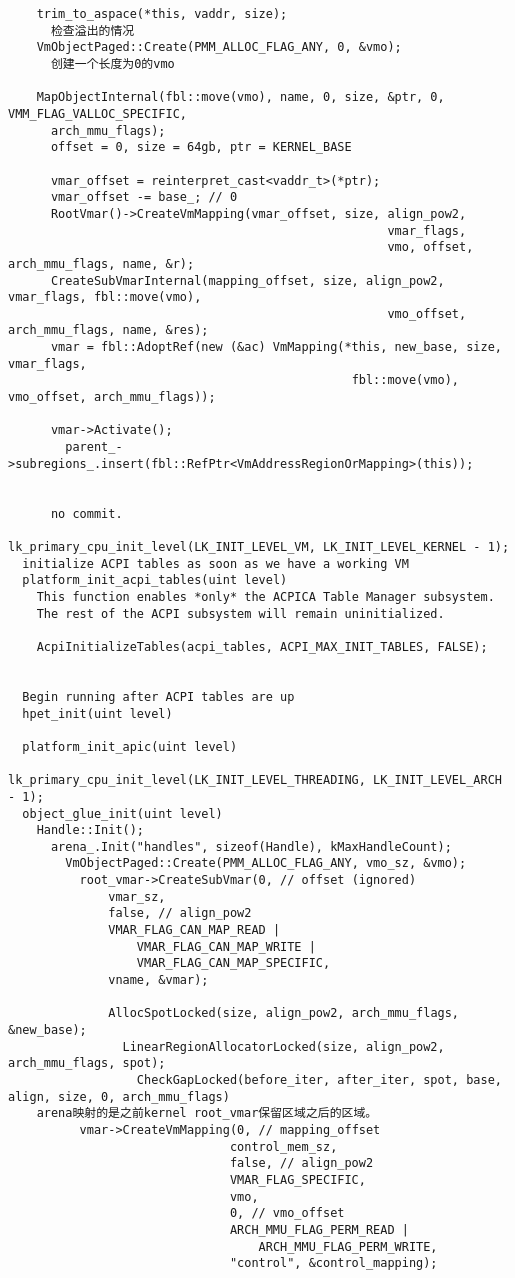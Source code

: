 \begin{verbatim}
    trim_to_aspace(*this, vaddr, size);
      检查溢出的情况
    VmObjectPaged::Create(PMM_ALLOC_FLAG_ANY, 0, &vmo);  
      创建一个长度为0的vmo

    MapObjectInternal(fbl::move(vmo), name, 0, size, &ptr, 0, VMM_FLAG_VALLOC_SPECIFIC,
      arch_mmu_flags);
      offset = 0, size = 64gb, ptr = KERNEL_BASE

      vmar_offset = reinterpret_cast<vaddr_t>(*ptr);
      vmar_offset -= base_; // 0
      RootVmar()->CreateVmMapping(vmar_offset, size, align_pow2,
                                                     vmar_flags,
                                                     vmo, offset, arch_mmu_flags, name, &r);
      CreateSubVmarInternal(mapping_offset, size, align_pow2, vmar_flags, fbl::move(vmo),
                                                     vmo_offset, arch_mmu_flags, name, &res);
      vmar = fbl::AdoptRef(new (&ac) VmMapping(*this, new_base, size, vmar_flags,
                                                fbl::move(vmo), vmo_offset, arch_mmu_flags));
      
      vmar->Activate();
        parent_->subregions_.insert(fbl::RefPtr<VmAddressRegionOrMapping>(this));
      
      
      no commit.

lk_primary_cpu_init_level(LK_INIT_LEVEL_VM, LK_INIT_LEVEL_KERNEL - 1);
  initialize ACPI tables as soon as we have a working VM
  platform_init_acpi_tables(uint level)
    This function enables *only* the ACPICA Table Manager subsystem.
    The rest of the ACPI subsystem will remain uninitialized.

    AcpiInitializeTables(acpi_tables, ACPI_MAX_INIT_TABLES, FALSE);

  
  Begin running after ACPI tables are up
  hpet_init(uint level)

  platform_init_apic(uint level)

lk_primary_cpu_init_level(LK_INIT_LEVEL_THREADING, LK_INIT_LEVEL_ARCH - 1);
  object_glue_init(uint level)
    Handle::Init();
      arena_.Init("handles", sizeof(Handle), kMaxHandleCount);
        VmObjectPaged::Create(PMM_ALLOC_FLAG_ANY, vmo_sz, &vmo);
          root_vmar->CreateSubVmar(0, // offset (ignored)
              vmar_sz,
              false, // align_pow2
              VMAR_FLAG_CAN_MAP_READ |
                  VMAR_FLAG_CAN_MAP_WRITE |
                  VMAR_FLAG_CAN_MAP_SPECIFIC,
              vname, &vmar);

              AllocSpotLocked(size, align_pow2, arch_mmu_flags, &new_base);
                LinearRegionAllocatorLocked(size, align_pow2, arch_mmu_flags, spot);
                  CheckGapLocked(before_iter, after_iter, spot, base, align, size, 0, arch_mmu_flags)
    arena映射的是之前kernel root_vmar保留区域之后的区域。
          vmar->CreateVmMapping(0, // mapping_offset
                               control_mem_sz,
                               false, // align_pow2
                               VMAR_FLAG_SPECIFIC,
                               vmo,
                               0, // vmo_offset
                               ARCH_MMU_FLAG_PERM_READ |
                                   ARCH_MMU_FLAG_PERM_WRITE,
                               "control", &control_mapping);


\end{verbatim}

